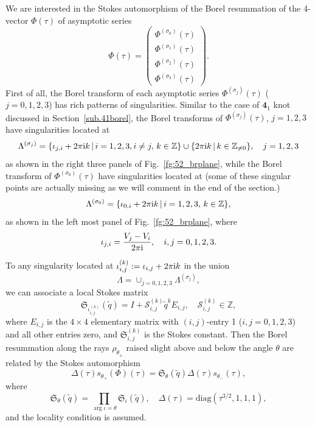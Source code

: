\documentclass[12pt,reqno]{amsart}
\theoremstyle{definition}
\def\IZ{\mathbb{Z}}
\def\s{\sigma}
\def\tq{\tilde{q}}
\def\ri{\mathrm{i}}
\def\ri{{\rm i}}
\def\diag{\mathrm{diag}}
\def\mc{\mathcal}
\def\md{\mathbf}
\def\mf{\mathfrak}
\def\IZ{\mathbb{Z}}
\newcommand{\knot}[1]{\md{#1}}
\begin{document}
We are interested in the Stokes automorphism of the Borel resummation
of the 4-vector $\Phi(\tau)$ of asymptotic series
\begin{equation}
  \Phi(\tau) =
  \begin{pmatrix}
    \Phi^{(\s_0)}(\tau)\\
    \Phi^{(\s_1)}(\tau)\\
    \Phi^{(\s_2)}(\tau)\\
    \Phi^{(\s_3)}(\tau)
  \end{pmatrix}.
\end{equation}
First of all, the Borel transform of each asymptotic series
$\Phi^{(\s_j)}(\tau)$ ($j=0,1,2,3$) has rich patterns of
singularities.  Similar to the case of $\knot{4}_1$ knot discussed in
Section~\ref{sub.41borel}, the Borel transforms of
$\Phi^{(\s_j)}(\tau)$, $j=1,2,3$ have singularities located at
\begin{equation}
  \Lambda^{(\s_j)} = \{\iota_{j,i} + 2\pi\ri k
  \,|\, i=1,2,3,i\neq j,\,k\in\IZ \} \cup
  \{ 2\pi\ri k \,|\, k\in\IZ_{\neq 0}
  \},\quad j=1,2,3
\end{equation}
as shown in the right three panels of Fig.~\ref{fg:52_brplane},
while the Borel transform of $\Phi^{(\s_0)}(\tau)$ have singularities
located at (some of these singular points are actually missing as we
will comment in the end of the section.)
\begin{equation}
  \Lambda^{(\s_0)} = \{\iota_{0,i}+2\pi\ri k
  \,|\, i=1,2,3,\,k\in\IZ\},
\end{equation}
as shown in the left most panel of Fig.~\ref{fg:52_brplane}, where
\begin{equation}
  \iota_{j,i} = \frac{V_j-V_i}{2\pi\ri},\quad i,j=0,1,2,3.
\end{equation}

To any singularity located at $\iota_{i,j}^{(k)}:= \iota_{i,j}+2\pi\ri
k$ in the union 
\begin{equation}
  \Lambda = \cup_{j=0,1,2,3} \Lambda^{(\s_j)},
  \label{eq:Lmb52}
\end{equation}
we can associate a local Stokes matrix
\begin{equation}
  \mf{S}_{\iota_{i,j}^{(k)}}(\tq) = I + \mc{S}_{i,j}^{(k)}\tq^k
  E_{i,j},\quad \mc{S}_{i,j}^{(k)}\in\IZ,
\end{equation}
where $E_{i,j}$ is the $4\times 4$ elementary matrix with
$(i,j)$-entry 1 ($i,j=0,1,2,3$) and all other entries zero, and
$\mf{S}_{i,j}^{(k)}$ is the Stokes constant.
Then the Borel resummation along the rays $\rho_{\theta_\pm}$ raised
slight above and below the angle $\theta$ are related by the Stokes
automorphism
\begin{equation}
  \Delta(\tau)s_{\theta_+}(\Phi)(\tau) =
  \mf{S}_{\theta}(\tq)\Delta(\tau) s_{\theta_-}(\tau),
\end{equation}
where
\begin{equation}
  \mf{S}_\theta(\tq) = \prod_{\arg\iota =
    \theta}\mf{S}_{\iota}(\tq),\quad
  \Delta(\tau) = \diag(\tau^{3/2},1,1,1),
\end{equation}
and the locality condition is assumed.
\end{document}
